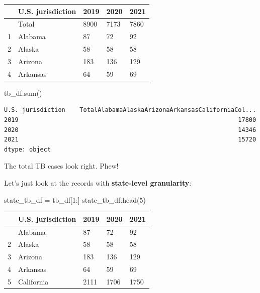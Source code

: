 \documentclass[
  letterpaper,
  DIV=11,
  numbers=noendperiod]{scrreprt}
\newenvironment{Shaded}{\begin{snugshade}}{\end{snugshade}}
\newcommand{\BuiltInTok}[1]{\textcolor[rgb]{0.00,0.23,0.31}{#1}}
\newcommand{\DecValTok}[1]{\textcolor[rgb]{0.68,0.00,0.00}{#1}}
\newcommand{\NormalTok}[1]{\textcolor[rgb]{0.00,0.23,0.31}{#1}}
\newcommand{\OperatorTok}[1]{\textcolor[rgb]{0.37,0.37,0.37}{#1}}
\begin{document}
\begin{longtable}[]{@{}lllll@{}}
\toprule\noalign{}
& U.S. jurisdiction & 2019 & 2020 & 2021 \\
\midrule\noalign{}
\endhead
\bottomrule\noalign{}
\endlastfoot
0 & Total & 8900 & 7173 & 7860 \\
1 & Alabama & 87 & 72 & 92 \\
2 & Alaska & 58 & 58 & 58 \\
3 & Arizona & 183 & 136 & 129 \\
4 & Arkansas & 64 & 59 & 69 \\
\end{longtable}

\begin{Shaded}
\begin{Highlighting}[]
\NormalTok{tb\_df.}\BuiltInTok{sum}\NormalTok{()}
\end{Highlighting}
\end{Shaded}

\begin{verbatim}
U.S. jurisdiction    TotalAlabamaAlaskaArizonaArkansasCaliforniaCol...
2019                                                             17800
2020                                                             14346
2021                                                             15720
dtype: object
\end{verbatim}

The total TB cases look right. Phew!

Let's just look at the records with \textbf{state-level granularity}:

\begin{Shaded}
\begin{Highlighting}[]
\NormalTok{state\_tb\_df }\OperatorTok{=}\NormalTok{ tb\_df[}\DecValTok{1}\NormalTok{:]}
\NormalTok{state\_tb\_df.head(}\DecValTok{5}\NormalTok{)}
\end{Highlighting}
\end{Shaded}

\begin{longtable}[]{@{}lllll@{}}
\toprule\noalign{}
& U.S. jurisdiction & 2019 & 2020 & 2021 \\
\midrule\noalign{}
\endhead
\bottomrule\noalign{}
\endlastfoot
1 & Alabama & 87 & 72 & 92 \\
2 & Alaska & 58 & 58 & 58 \\
3 & Arizona & 183 & 136 & 129 \\
4 & Arkansas & 64 & 59 & 69 \\
5 & California & 2111 & 1706 & 1750 \\
\end{longtable}
\end{document}
